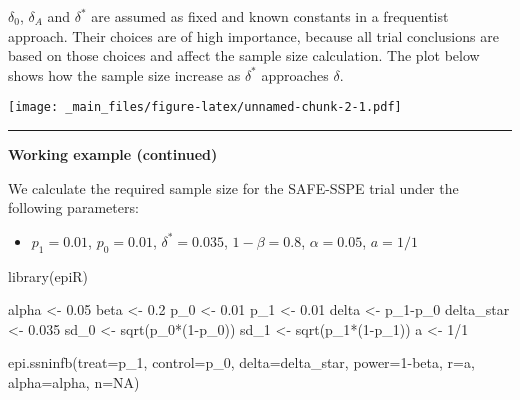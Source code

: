 \documentclass[
]{book}
\newenvironment{Shaded}{\begin{snugshade}}{\end{snugshade}}
\newcommand{\AttributeTok}[1]{\textcolor[rgb]{0.77,0.63,0.00}{#1}}
\newcommand{\ConstantTok}[1]{\textcolor[rgb]{0.00,0.00,0.00}{#1}}
\newcommand{\DecValTok}[1]{\textcolor[rgb]{0.00,0.00,0.81}{#1}}
\newcommand{\FloatTok}[1]{\textcolor[rgb]{0.00,0.00,0.81}{#1}}
\newcommand{\FunctionTok}[1]{\textcolor[rgb]{0.00,0.00,0.00}{#1}}
\newcommand{\NormalTok}[1]{#1}
\newcommand{\OtherTok}[1]{\textcolor[rgb]{0.56,0.35,0.01}{#1}}
\newcommand{\SpecialCharTok}[1]{\textcolor[rgb]{0.00,0.00,0.00}{#1}}
\providecommand{\tightlist}{%
  \setlength{\itemsep}{0pt}\setlength{\parskip}{0pt}}
\begin{document}
\(\delta_0\), \(\delta_A\) and \(\delta^*\) are assumed as fixed and known constants in a frequentist approach. Their choices are of high importance, because all trial conclusions are based on those choices and affect the sample size calculation. The plot below shows how the sample size increase as \(\delta^*\) approaches \(\delta\).

\texttt{[image: \_main\_files/figure-latex/unnamed-chunk-2-1.pdf]}

\begin{center}\rule{0.5\linewidth}{0.5pt}\end{center}

\textbf{Working example (continued)}

We calculate the required sample size for the SAFE-SSPE trial under the following parameters:

\begin{itemize}
\tightlist
\item
  \(p_1=0.01\), \(p_0=0.01\), \(\delta^*=0.035\), \(1-\beta=0.8\), \(\alpha=0.05\), \(a=1/1\)
\end{itemize}

\begin{Shaded}
\begin{Highlighting}[]
\FunctionTok{library}\NormalTok{(epiR)}

\NormalTok{alpha }\OtherTok{\textless{}{-}} \FloatTok{0.05}
\NormalTok{beta }\OtherTok{\textless{}{-}} \FloatTok{0.2}
\NormalTok{p\_0 }\OtherTok{\textless{}{-}} \FloatTok{0.01}
\NormalTok{p\_1 }\OtherTok{\textless{}{-}} \FloatTok{0.01}
\NormalTok{delta }\OtherTok{\textless{}{-}}\NormalTok{ p\_1}\SpecialCharTok{{-}}\NormalTok{p\_0}
\NormalTok{delta\_star }\OtherTok{\textless{}{-}} \FloatTok{0.035}
\NormalTok{sd\_0 }\OtherTok{\textless{}{-}} \FunctionTok{sqrt}\NormalTok{(p\_0}\SpecialCharTok{*}\NormalTok{(}\DecValTok{1}\SpecialCharTok{{-}}\NormalTok{p\_0))}
\NormalTok{sd\_1 }\OtherTok{\textless{}{-}} \FunctionTok{sqrt}\NormalTok{(p\_1}\SpecialCharTok{*}\NormalTok{(}\DecValTok{1}\SpecialCharTok{{-}}\NormalTok{p\_1))}
\NormalTok{a }\OtherTok{\textless{}{-}} \DecValTok{1}\SpecialCharTok{/}\DecValTok{1}

\FunctionTok{epi.ssninfb}\NormalTok{(}\AttributeTok{treat=}\NormalTok{p\_1, }\AttributeTok{control=}\NormalTok{p\_0, }\AttributeTok{delta=}\NormalTok{delta\_star, }\AttributeTok{power=}\DecValTok{1}\SpecialCharTok{{-}}\NormalTok{beta, }\AttributeTok{r=}\NormalTok{a, }\AttributeTok{alpha=}\NormalTok{alpha, }\AttributeTok{n=}\ConstantTok{NA}\NormalTok{)}
\end{Highlighting}
\end{Shaded}
\end{document}
